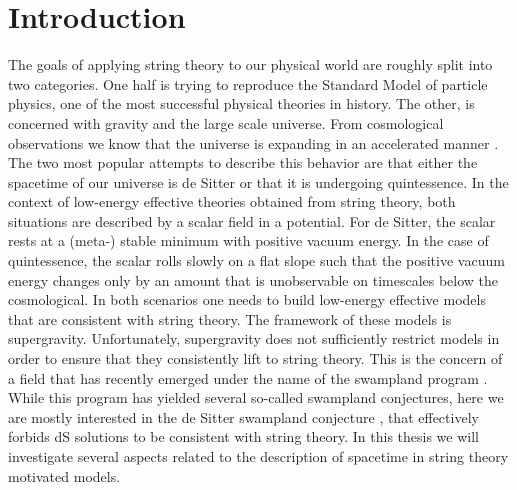 \documentclass[a4paper,12pt,twoside,openright]{report}
\begin{document}
\chapter{Introduction}
The goals of applying string theory to our physical world are roughly split into two categories. One half is trying to reproduce the Standard Model of particle physics, one of the most successful physical theories in history. The other, is concerned with gravity and the large scale universe. From cosmological observations we know that the universe is expanding in an accelerated manner \cite{Planck:2018jri}. The two most popular attempts to describe this behavior are that either the spacetime of our universe is de Sitter or that it is undergoing quintessence. In the context of low-energy effective theories obtained from string theory, both situations are described by a scalar field in a potential. For de Sitter, the scalar rests at a (meta-) stable minimum with positive vacuum energy. In the case of quintessence, the scalar rolls slowly on a flat slope such that the positive vacuum energy changes only by an amount that is unobservable on timescales below the cosmological. In both scenarios one needs to build low-energy effective models that are consistent with string theory. The framework of these models is supergravity. Unfortunately, supergravity does not sufficiently restrict models in order to ensure that they consistently lift to string theory. This is the concern of a field that has recently emerged under the name of the swampland program \cite{Brennan:2017rbf,Palti:2019pca,vanBeest:2021lhn}. While this program has yielded several so-called swampland conjectures, here we are mostly interested in the de Sitter swampland conjecture \cite{Obied:2018sgi}, that effectively forbids dS solutions to be consistent with string theory. In this thesis we will investigate several aspects related to the description of spacetime in string theory motivated models.\\
\end{document}
